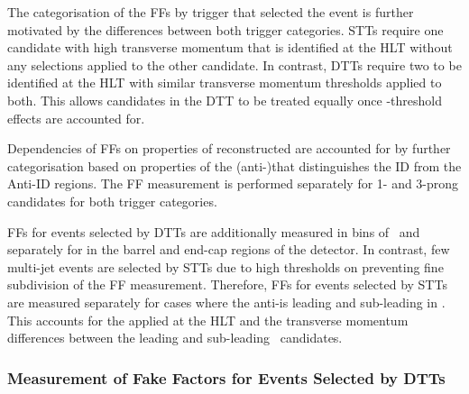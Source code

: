 The categorisation of the FFs by trigger that selected the event is further
motivated by the differences between both trigger categories. STTs require one
\tauhadvis candidate with high transverse momentum that is identified at the HLT
without any selections applied to the other candidate. In contrast, DTTs require
two \tauhadvis to be identified at the HLT with similar transverse momentum
thresholds applied to both. This allows \tauhadvis candidates in the DTT to be
treated equally once \pT-threshold effects are accounted
for. %

Dependencies of FFs on properties of reconstructed \tauhadvis are accounted for
by further categorisation based on properties of the (anti-)\tauhadvis that
distinguishes the ID from the Anti-ID regions. The FF measurement is performed
separately for 1- and 3-prong \tauhadvis candidates for both trigger categories.

FFs for events selected by DTTs are additionally measured in bins of
\tauhadvis~\pT and separately for \tauhadvis in the barrel and end-cap regions
of the detector. In contrast, few multi-jet events are selected by STTs due to
high \pT thresholds on \tauhadvis preventing fine subdivision of the FF
measurement. Therefore, FFs for events selected by STTs are measured separately
for cases where the anti-\tauhadvis is leading and sub-leading in \pT. This
accounts for the \tauid applied at the HLT and the transverse momentum
differences between the leading and sub-leading \tauhadvis~candidates.


\subsubsection{Measurement of Fake Factors for Events Selected by DTTs}

